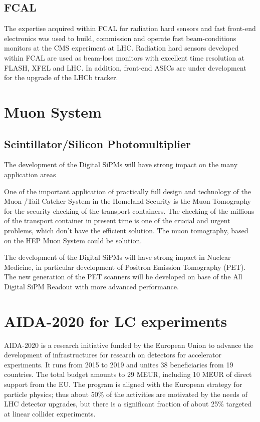 \subsection{FCAL}
The expertise acquired within FCAL for radiation hard sensors and fast front-end electronics was
used to build, commission and operate fast
beam-conditions monitors at the CMS experiment at LHC.
Radiation hard sensors developed within FCAL are used as beam-loss monitors
with excellent time resolution at FLASH, XFEL and LHC.
In addition, front-end ASICs are under development for the upgrade of the LHCb tracker.

\section{Muon System}
\subsection{Scintillator/Silicon Photomultiplier}
The development of the Digital SiPMs will have strong impact on the many application areas

One of the important application of practically full design and technology of the Muon /Tail Catcher System in the Homeland Security is the Muon Tomography for the security checking of the transport containers. The checking of the millions of the transport container in present time is one of the crucial and urgent problems, which don't have the efficient solution. The muon tomography, based on the HEP Muon System could be solution.

The development of the Digital SiPMs will have strong impact in Nuclear Medicine, in particular development of  Positron Emission Tomography (PET).  The new generation of the PET scanners will be developed on base of the All Digital SiPM Readout with more advanced performance.

\section{AIDA-2020 for LC experiments}
AIDA-2020 is a research initiative funded by the European Union to advance the development of infrastructures for research on detectors for accelerator experiments. It runs from 2015 to 2019 and unites 38 beneficiaries from 19 countries. The total budget amounts to 29 MEUR, including 10 MEUR of direct support from the EU. The program is aligned with the European strategy for particle physics; thus about 50\% of the activities are motivated by the needs of LHC detector upgrades, but there is a significant fraction of about 25\% targeted at linear collider experiments.

